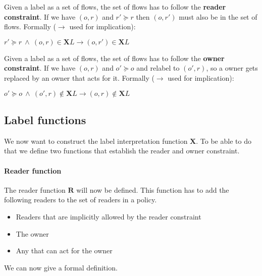 \begin{definition}
  Given a label as a set of flows, the set of flows has to follow the \textbf{reader constraint}.
  If we have $(o,r)$ and $r' \succeq r$ then $(o,r')$ must also be in the set of flows.
  Formally ($\rightarrow$ used for implication):
  \begin{center}
    $r' \succeq r \ \wedge \ (o,r) \in \textbf{X}L \rightarrow (o,r') \in \textbf{X}L$
  \end{center}
\end{definition}

\begin{definition}
  Given a label as a set of flows, the set of flows has to follow the \textbf{owner constraint}.
  If we have $(o,r)$ and $o' \succeq o$ and relabel to $(o',r)$, so a owner gets replaced by an owner that acts for it.
  Formally ($\rightarrow$ used for implication):
  \begin{center}
    $o' \succeq o \ \wedge \ (o',r) \notin \textbf{X}L \rightarrow (o,r) \notin \textbf{X}L$
  \end{center}
\end{definition}


\subsection{Label functions}
We now want to construct the label interpretation function $\textbf{X}$.
To be able to do that we define two functions that establish the reader and owner constraint.

\paragraph{Reader function}
The reader function $\textbf{R}$ will now be defined.
This function has to add the following readers to the set of readers in a policy.
\begin{itemize}
\item Readers that are implicitly allowed by the reader constraint
\item The owner
\item Any \principals{} that can act for the owner
\end{itemize}
We can now give a formal definition.

